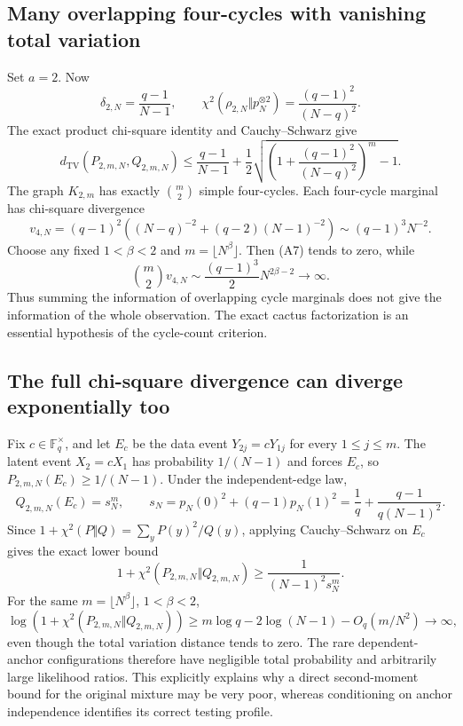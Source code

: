 \subsection{Many overlapping four-cycles with vanishing total variation}
Set $a=2$. Now
\[
 \delta_{2,N}=\frac{q-1}{N-1},\qquad
 \chi^2(\rho_{2,N}\Vert p_N^{\otimes2})
      =\frac{(q-1)^2}{(N-q)^2}.
\]
The exact product chi-square identity and Cauchy--Schwarz give
\[
 d_{\mathrm{TV}}(P_{2,m,N},Q_{2,m,N})
 \le\frac{q-1}{N-1}
 +\frac12\sqrt{\left(1+\frac{(q-1)^2}{(N-q)^2}\right)^m-1}.
\tag{A7}
\]
The graph $K_{2,m}$ has exactly $\binom m2$ simple four-cycles.
Each four-cycle marginal has chi-square divergence
\[
 v_{4,N}=(q-1)^2\left((N-q)^{-2}+(q-2)(N-1)^{-2}\right)
       \sim(q-1)^3N^{-2}.
\]
Choose any fixed $1<\beta<2$ and $m=\lfloor N^\beta\rfloor$.
Then (A7) tends to zero, while
\[
 \binom m2 v_{4,N}\sim\frac{(q-1)^3}{2}N^{2\beta-2}
 \longrightarrow\infty.
\tag{A8}
\]
Thus summing the information of overlapping cycle marginals does not give
the information of the whole observation. The exact cactus factorization
is an essential hypothesis of the cycle-count criterion.

\subsection{The full chi-square divergence can diverge exponentially too}
Fix $c\in\mathbb F_q^\times$, and let $E_c$ be the data event
$Y_{2j}=cY_{1j}$ for every $1\le j\le m$.
The latent event $X_2=cX_1$ has probability $1/(N-1)$ and forces $E_c$,
so $P_{2,m,N}(E_c)\ge1/(N-1)$.
Under the independent-edge law,
\[
 Q_{2,m,N}(E_c)=s_N^m,\qquad
 s_N=p_N(0)^2+(q-1)p_N(1)^2
    =\frac1q+\frac{q-1}{q(N-1)^2}.
\]
Since $1+\chi^2(P\Vert Q)=\sum_y P(y)^2/Q(y)$, applying
Cauchy--Schwarz on $E_c$ gives the exact lower bound
\[
 1+\chi^2(P_{2,m,N}\Vert Q_{2,m,N})
 \ge\frac1{(N-1)^2s_N^m}.
\tag{A9}
\]
For the same $m=\lfloor N^\beta\rfloor$, $1<\beta<2$,
\[
 \log(1+\chi^2(P_{2,m,N}\Vert Q_{2,m,N}))
 \ge m\log q-2\log(N-1)-O_q(m/N^2)
 \longrightarrow\infty,
\]
even though the total variation distance tends to zero.
The rare dependent-anchor configurations therefore have negligible total
probability and arbitrarily large likelihood ratios. This explicitly
explains why a direct second-moment bound for the original mixture may be
very poor, whereas conditioning on anchor independence identifies its
correct testing profile.
